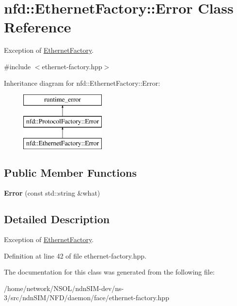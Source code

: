 \hypertarget{classnfd_1_1EthernetFactory_1_1Error}{}\section{nfd\+:\+:Ethernet\+Factory\+:\+:Error Class Reference}
\label{classnfd_1_1EthernetFactory_1_1Error}


Exception of \hyperlink{classnfd_1_1EthernetFactory}{Ethernet\+Factory}.  




{\ttfamily \#include $<$ethernet-\/factory.\+hpp$>$}

Inheritance diagram for nfd\+:\+:Ethernet\+Factory\+:\+:Error\+:\begin{figure}[H]
\begin{center}
\leavevmode
\includegraphics[height=3.000000cm]{classnfd_1_1EthernetFactory_1_1Error}
\end{center}
\end{figure}
\subsection*{Public Member Functions}
\begin{DoxyCompactItemize}
\item 
{\bfseries Error} (const std\+::string \&what)\hypertarget{classnfd_1_1EthernetFactory_1_1Error_abe738f4e11a297c9926efd250fbe69db}{}\label{classnfd_1_1EthernetFactory_1_1Error_abe738f4e11a297c9926efd250fbe69db}

\end{DoxyCompactItemize}


\subsection{Detailed Description}
Exception of \hyperlink{classnfd_1_1EthernetFactory}{Ethernet\+Factory}. 

Definition at line 42 of file ethernet-\/factory.\+hpp.



The documentation for this class was generated from the following file\+:\begin{DoxyCompactItemize}
\item 
/home/network/\+N\+S\+O\+L/ndn\+S\+I\+M-\/dev/ns-\/3/src/ndn\+S\+I\+M/\+N\+F\+D/daemon/face/ethernet-\/factory.\+hpp\end{DoxyCompactItemize}
